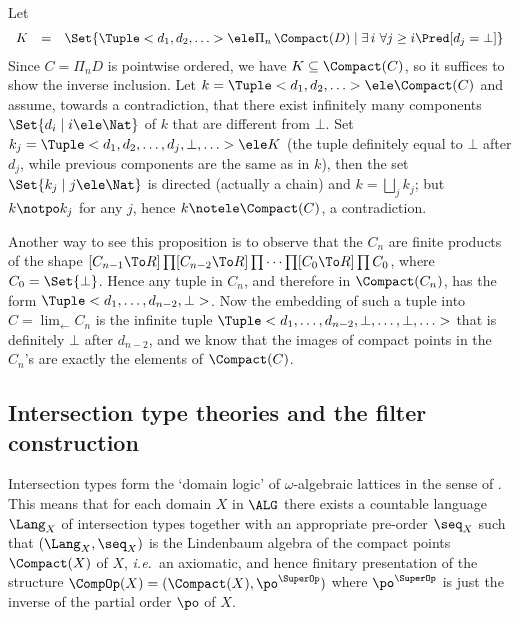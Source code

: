 \documentclass{CSML}
\def\ie{\emph{i.e.}}
\begin{document}
 \begin{Proof}
Let 
%
 \[ \begin{array}{rcl}
K &=& \Set{\Tuple <d_1, d_2, \ldots > \ele \Pi_n \, \Compact(D) \mid \exists \,i \ \forall j\geq i \Pred[ d_j = \bot ] }
 \end{array} \]
Since $C = \Pi_n D$ is pointwise ordered, we have %
$K \subseteq \Compact(C)$, so %
it suffices to show the inverse inclusion.
%
Let $k = \Tuple <d_1, d_2, \ldots > \ele \Compact(C)$ and assume, towards a contradiction, that there exist infinitely many components $\Set{d_i \mid i \ele \Nat}$ of $k$ that are different from $\bot$. 
Set $k_j = \Tuple <d_1, d_2, \ldots, d_{j}, \bot, \ldots > \ele K$ (the tuple definitely equal to $\bot$ after $d_j$, while previous components are the same as in $k$), then the set $\Set{k_j \mid j\ele \Nat}$ is directed (actually a chain) and $k = \bigsqcup_j k_j$; but $k \notpo k_j$ for any $j$, hence $k\notele \Compact(C)$, a contradiction. 
 \end{Proof}

Another way to see this proposition is to observe that the $C_n$ are finite products of the shape $[C_{n-1} \To R]\prod [C_{n-2} \To R]\prod \cdots\prod [C_0\To R]\prod C_0$, where $C_0 = \Set{\bot}$.
Hence any tuple in $C_n$, and therefore in $\Compact(C_n)$, has the form $\Tuple <d_1,\ldots,d_{n-2},\bot>$. 
Now the embedding of such a tuple into $C = \lim_{\leftarrow} C_n$ is the infinite tuple
$\Tuple <d_1,\ldots,d_{n-2},\bot,\ldots,\bot,\ldots>$ that is definitely $\bot$ after $d_{n-2}$, and we know that the images of compact points in the $C_n$'s are exactly the elements of $\Compact(C)$.



 \subsection{Intersection type theories and the filter construction} \label{w-algebraic-lattices}

Intersection types form the `domain logic' of $\omega$-algebraic lattices in the sense of \cite{Abramsky'91}. 
This means that for each domain $X$ in $\ALG$ there exists a countable language $\Lang_X$ of intersection types together with an appropriate pre-order $\seq_X$ such that $(\Lang_X,\seq_X)$ is the Lindenbaum algebra of the compact points $\Compact(X)$ of $X$, 
\ie~an axiomatic, and hence finitary presentation of the structure $\CompOp(X) = (\Compact(X), \po^{\SuperOp})$ where $\po^{\SuperOp}$ is just the inverse of the partial order $\po$ of $X$.
\end{document}
